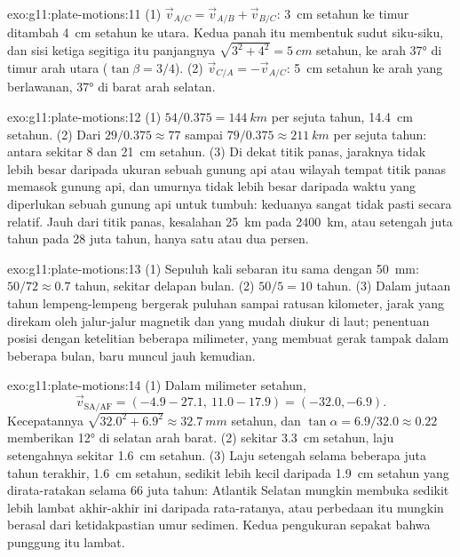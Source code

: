 \begin{solution}{exo:g11:plate-motions:11}
(1) $\vec v_{A/C} = \vec v_{A/B} + \vec v_{B/C}$: \qty{3}{cm} setahun ke timur
ditambah \qty{4}{cm} setahun ke utara. Kedua panah itu membentuk sudut siku-siku,
dan sisi ketiga segitiga itu panjangnya $\sqrt{3^2 + 4^2} = \qty{5}{cm}$ setahun,
ke arah \ang{37} di timur arah utara ($\tan\beta = 3/4$). (2) $\vec v_{C/A}
= -\vec v_{A/C}$: \qty{5}{cm} setahun ke arah yang berlawanan, \ang{37} di barat
arah selatan.
\end{solution}

\begin{solution}{exo:g11:plate-motions:12}
(1) $54/0.375 = \qty{144}{km}$ per sejuta tahun, \qty{14.4}{cm} setahun. (2)
Dari $29/0.375 \approx 77$ sampai $79/0.375 \approx \qty{211}{km}$ per sejuta
tahun: antara sekitar 8 dan \qty{21}{cm} setahun. (3) Di dekat titik panas,
jaraknya tidak lebih besar daripada ukuran sebuah gunung api atau wilayah tempat
titik panas memasok gunung api, dan umurnya tidak lebih besar daripada waktu yang
diperlukan sebuah gunung api untuk tumbuh: keduanya sangat tidak pasti secara
relatif. Jauh dari titik panas, kesalahan \qty{25}{km} pada \qty{2400}{km}, atau
setengah juta tahun pada 28 juta tahun, hanya satu atau dua persen.
\end{solution}

\begin{solution}{exo:g11:plate-motions:13}
(1) Sepuluh kali sebaran itu sama dengan \qty{50}{mm}: $50/72 \approx 0.7$
tahun, sekitar delapan bulan. (2) $50/5 = 10$ tahun. (3) Dalam jutaan tahun
lempeng-lempeng bergerak puluhan sampai ratusan kilometer, jarak yang direkam
oleh jalur-jalur magnetik dan yang mudah diukur di laut; penentuan posisi
dengan ketelitian beberapa milimeter, yang membuat gerak tampak dalam beberapa
bulan, baru muncul jauh kemudian.
\end{solution}

\begin{solution}{exo:g11:plate-motions:14}
(1) Dalam milimeter setahun,
\[
  \vec v_{\mathrm{SA/AF}} = (-4.9 - 27.1,\ 11.0 - 17.9) = (-32.0, -6.9).
\] Kecepatannya $\sqrt{32.0^2 + 6.9^2} \approx
\qty{32.7}{mm}$ setahun, dan $\tan\alpha = 6.9/32.0 \approx 0.22$ memberikan
\ang{12} di selatan arah barat. (2)  sekitar \qty{3.3}{cm}
setahun, laju setengahnya sekitar \qty{1.6}{cm} setahun. (3) Laju setengah
selama beberapa juta tahun terakhir, \qty{1.6}{cm} setahun, sedikit lebih kecil
daripada \qty{1.9}{cm} setahun yang dirata-ratakan selama 66 juta tahun:
Atlantik Selatan mungkin membuka sedikit lebih lambat akhir-akhir ini daripada
rata-ratanya, atau perbedaan itu mungkin berasal dari ketidakpastian umur
sedimen. Kedua pengukuran sepakat bahwa punggung itu lambat.
\end{solution}


